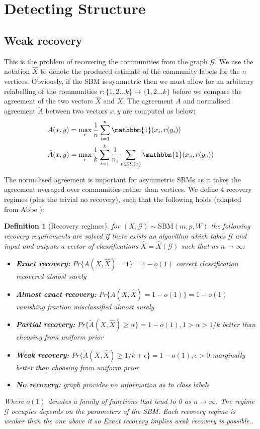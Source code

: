 \documentclass[]{article}
\newcommand{\Gcal}{\mathcal{G}}
\newcommand{\one}{\mathbbm{1}}
\newtheorem{definition}{Definition}[section]
\begin{document}
\section{Detecting Structure}
\subsection{Weak recovery}

This is the problem of recovering the communities from the graph $\Gcal$. We use the notation $\hat{X}$ to denote the produced estimate of the community labels for the $n$ vertices. Obviously, if the SBM is symmetric then we must allow for an arbitrary relabelling of the communities $r: \{1, 2 \dots k\} \mapsto \{1, 2 \dots k\}$ before we compare the agreement of the two vectors $\hat{X}$ and $X$. The agreement $A$ and normalised agreement $\tilde{A}$ between two vectors $x, y$ are computed as below:
%
\begin{align}
	A(x, y) &= \max_r \frac{1}{n} \sum_{i=1}^{n} \one (x_i, r(y_i)) \\
	\tilde{A}(x, y) &= \max_r \frac{1}{k} \sum_{i=1}^{k} \frac{1}{n_i} \sum_{v \in \Omega_i(x)} \one(x_v, r(y_v))
\end{align}

The normalised agreement is important for asymmetric SBMs as it takes the agreement averaged over communities rather than vertices. We define 4 recovery regimes (plus the trivial no recovery), such that the following holds (adapted from Abbe \cite{Abbe}):

\begin{definition}[Recovery regimes]
	for $(X, \Gcal) \sim \textrm{SBM}(m, p, W)$ the following recovery requirements are solved if there exists an algorithm which takes $\Gcal$ and input and outputs a vector of classifications $\hat{X} = \hat{X}(\Gcal)$ such that as $n \rightarrow \infty$:
	\begin{itemize}
		\item \textbf{Exact recovery:} $Pr\{A(X, \hat{X}) = 1\} = 1 - o(1)$ correct classification recovered almost surely
		\item \textbf{Almost exact recovery:} $Pr\{A(X, \hat{X}) = 1 - o(1)\} = 1 - o(1)$ vanishing fraction misclassified almost surely
		\item \textbf{Partial recovery:} $Pr\{\tilde{A}(X, \hat{X}) \geq \alpha\} = 1 - o(1), 1 > \alpha > 1/k$ better than choosing from uniform prior
		\item \textbf{Weak recovery:} $Pr\{\tilde{A}(X, \hat{X}) \geq 1/k + \epsilon \} = 1 - o(1), \epsilon > 0$ marginally better than choosing from uniform prior
		\item \textbf{No recovery:} graph provides no information as to class labels
	\end{itemize}
	Where $o(1)$ denotes a family of functions that tend to 0 as $n \rightarrow \infty$. The regime $\Gcal$ occupies depends on the parameters of the SBM. Each recovery regime is weaker than the one above it so Exact recovery implies weak recovery is possible..
\end{definition}
\end{document}
